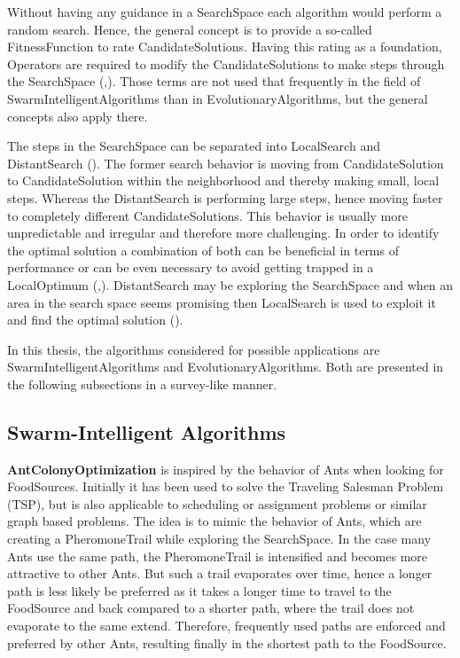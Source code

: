 Without having any guidance in a \gls{SearchSpace} each algorithm would perform a random search. Hence, the general concept is to provide a so-called \gls{FitnessFunction} to rate \glspl{CandidateSolution}. Having this rating as a foundation, \glspl{Operator} are required to modify the \glspl{CandidateSolution} to make steps through the \gls{SearchSpace} (\cite{holland75},\cite{Ashlock2004}). Those terms are not used that frequently in the field of \glspl{SwarmIntelligentAlgorithm} than in \glspl{EvolutionaryAlgorithm}, but the general concepts also apply there.

The steps in the \gls{SearchSpace} can be separated into \gls{LocalSearch} and \gls{DistantSearch} (\cite{Ashlock2004}). The former search behavior is moving from \gls{CandidateSolution} to \gls{CandidateSolution} within the neighborhood and thereby making small, local steps. Whereas the \gls{DistantSearch} is performing large steps, hence moving faster to completely different \glspl{CandidateSolution}. This behavior is usually more unpredictable and irregular and therefore more challenging. 
In order to identify the optimal solution a combination of both can be beneficial in terms of performance or can be even necessary to avoid getting trapped in a \gls{LocalOptimum} (\cite{Kessentini2010},\cite{holland75}). \Gls{DistantSearch} may be exploring the \gls{SearchSpace} and when an area in the search space seems promising then \gls{LocalSearch} is used to exploit it and find the optimal solution (\cite{Kessentini2010}).

In this thesis, the algorithms considered for possible applications are \glspl{SwarmIntelligentAlgorithm} and \glspl{EvolutionaryAlgorithm}. Both are presented in the following subsections in a survey-like manner.

\subsection{Swarm-Intelligent Algorithms}\label{secSwarmIntelligentAlgorithms}

\textbf{\Gls{AntColonyOptimization}} \cite{Dorigo} is inspired by the behavior of \glspl{Ant} when looking for \glspl{FoodSource}. Initially it has been used to solve the Traveling Salesman Problem (TSP), but is also applicable to scheduling or assignment problems or similar graph based problems. The idea is to mimic the behavior of \glspl{Ant}, which are creating a \gls{PheromoneTrail} while exploring the \gls{SearchSpace}. In the case many \glspl{Ant} use the same path, the \gls{PheromoneTrail} is intensified and becomes more attractive to other \glspl{Ant}. But such a trail evaporates over time, hence a longer path is less likely be preferred as it takes a longer time to travel to the \gls{FoodSource} and back compared to a shorter path, where the trail does not evaporate to the same extend. Therefore, frequently used paths are enforced and preferred by other \glspl{Ant}, resulting finally in the shortest path to the \gls{FoodSource}.

